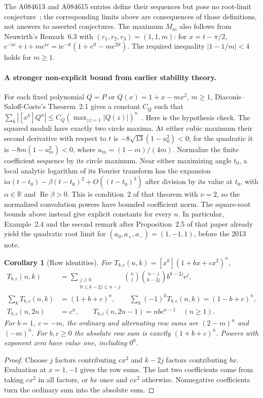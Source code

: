 \documentclass[11pt]{article}
\newtheorem{corollary}[theorem]{Corollary}
\begin{document}
The A084613 and A084615 entries define their sequences but pose no
root-limit conjecture~\cite{hanna-family}; the corresponding limits above
are consequences of those definitions, not answers to asserted conjectures.
The maximum $M_m$ also follows from Neuwirth's Remark~6.3 with
$(r_1,r_2,r_3)=(1,1,m)$: for $x=t-\pi/2$,
$e^{-\mathrm ix}+\mathrm i+m e^{\mathrm ix}
=\mathrm i e^{-\mathrm it}(1+e^{\mathrm it}-m e^{2\mathrm it})$.
The required inequality $|1-1/m|<4$ holds for $m\geq1$.

\paragraph{A stronger non-explicit bound from earlier stability theory.}
For each fixed polynomial $Q=P$ or $Q(x)=1+x-mx^2$, $m\geq1$,
Diaconis--Saloff-Coste's Theorem~2.1 gives a constant $C_Q$ such that
$\sum_k|[x^k]Q^n|\leq C_Q(\max_{|z|=1}|Q(z)|)^n$~\cite{diaconis}.
Here is the hypothesis check. The squared moduli have exactly two
circle maxima. At either cubic maximum their second derivative with
respect to $t$ is $-8\sqrt{13}(1-u_0^2)<0$; for the quadratic it is
$-8m(1-u_m^2)<0$, where $u_m=(1-m)/(4m)$.
Normalize the finite coefficient sequence by its circle maximum.
Near either maximizing angle $t_0$, a local analytic logarithm of its
Fourier transform has the expansion
$\mathrm i\alpha(t-t_0)-\beta(t-t_0)^2+O((t-t_0)^3)$
after division by its value at $t_0$, with $\alpha\in\mathbb R$
and $\operatorname{Re}\beta>0$. This is condition~2 of that theorem
with $\nu=2$, so the normalized convolution powers have bounded
coefficient norm. The square-root bounds above instead give explicit
constants for every $n$. In particular, Example~2.4 and the second
remark after Proposition~2.5 of that paper already yield the quadratic
root limit for $(a_0,a_+,a_-)=(1,-1,1)$, before the 2013 note.

\begin{corollary}[Row identities]\label{cor:rows}
For $T_{b,c}(n,k)=[x^k](1+bx+cx^2)^n$,
\begin{align*}
 T_{b,c}(n,k)&=\sum_{\substack{j\geq0\\0\leq k-2j\leq n-j}}
   \binom nj\binom{n-j}{k-2j}b^{k-2j}c^j,\\
 \sum_k T_{b,c}(n,k)&=(1+b+c)^n,\qquad
 \sum_k(-1)^k T_{b,c}(n,k)=(1-b+c)^n,\\
 T_{b,c}(n,2n)&=c^n,\qquad
 T_{b,c}(n,2n-1)=nbc^{n-1}\quad(n\geq1).
\end{align*}
For $b=1$, $c=-m$, the ordinary and alternating row sums are
$(2-m)^n$ and $(-m)^n$. For $b,c\geq0$ the absolute row sum is exactly
$(1+b+c)^n$. Powers with exponent zero have value one, including $0^0$.
\end{corollary}
\begin{proof}
Choose $j$ factors contributing $cx^2$ and $k-2j$ factors contributing $bx$.
Evaluation at $x=1,-1$ gives the row sums. The last two coefficients
come from taking $cx^2$ in all factors, or $bx$ once and $cx^2$ otherwise.
Nonnegative coefficients turn the ordinary sum into the absolute sum.
\end{proof}
\end{document}
